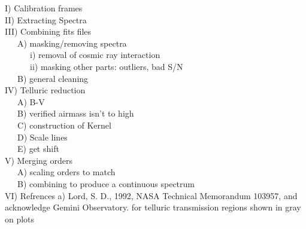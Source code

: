 
I) Calibration frames\\

II) Extracting Spectra\\

III) Combining fits files\\
~~~A) masking/removing spectra\\
~~~~~~i) removal of cosmic ray interaction\\
~~~~~~ii) masking other parts: outliers, bad S/N\\
~~~B) general cleaning\\

IV) Telluric reduction\\
~~~A) B-V\\
~~~B) verified airmass isn't to high\\
~~~C) construction of Kernel\\
~~~D) Scale lines\\
~~~E) get shift\\

V) Merging orders\\
~~~A) scaling orders to match\\
~~~B) combining to produce a continuous spectrum\\

VI) Refrences
  a) Lord, S. D., 1992, NASA Technical Memorandum 103957, and acknowledge Gemini Observatory.
  for telluric transmission regions shown in gray on plots
  
  
  
  
  
